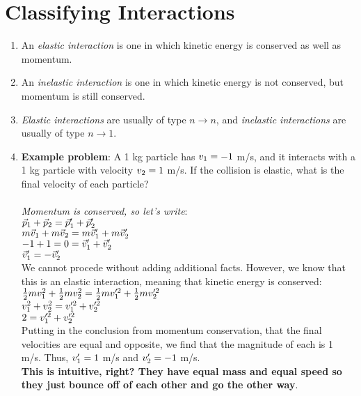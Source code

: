 \documentclass[10pt]{article}
\begin{document}
\section{Classifying Interactions}
\begin{enumerate}
\item An \textit{elastic interaction} is one in which kinetic energy is conserved as well as momentum.
\item An \textit{inelastic interaction} is one in which kinetic energy is not conserved, but momentum is still conserved.
\item \textit{Elastic interactions} are usually of type $n \rightarrow n$, and \textit{inelastic interactions} are usually of type $n \rightarrow 1$.
\item \textbf{Example problem}: A 1 kg particle has $v_{\rm 1} = -1$ m/s, and it interacts with a 1 kg particle with velocity $v_{\rm 2} = 1$ m/s.  If the collision is elastic, what is the final velocity of each particle? \\ \\
\textit{Momentum is conserved, so let's write}: \\ $\vec{p}_{\rm 1} + \vec{p}_{\rm 2} = \vec{p}_{\rm 1}' + \vec{p}_{\rm 2}'$ \\ $m\vec{v}_{\rm 1} + m\vec{v}_{\rm 2} = m\vec{v}_{\rm 1}' + m\vec{v}_{\rm 2}'$ \\ $-1 + 1 = 0 = \vec{v}_{\rm 1}' + \vec{v}_{\rm 2}'$ \\ $\vec{v}_{\rm 1}' = -\vec{v}_{\rm 2}'$ \\ We cannot procede without adding additional facts.  However, we know that this is an elastic interaction, meaning that kinetic energy is conserved: \\
$\frac{1}{2}m v_{\rm 1}^2 + \frac{1}{2}m v_{\rm 2}^2 = \frac{1	}{2}mv_{\rm 1}'^2 + \frac{1}{2}mv_{\rm 2}'^2$ \\ $v_{\rm 1}^2 + v_{\rm 2}^2 = v_{\rm 1}'^2 + v_{\rm 2}'^2$ \\ $2 = v_{\rm 1}'^2 + v_{\rm 2}'^2$ \\ Putting in the conclusion from momentum conservation, that the final velocities are equal and opposite, we find that the magnitude of each is 1 m/s.  Thus, $v_{\rm 1}' = 1$ m/s and $v_{\rm 2}' = -1$ m/s. \\
\textbf{This is intuitive, right?  They have equal mass and equal speed so they just bounce off of each other and go the other way}.
\end{enumerate}
\end{document}
